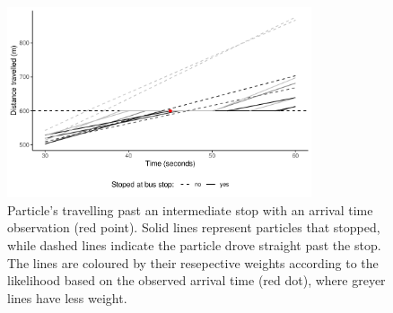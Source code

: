 \begin{knitrout}\small
{}\color{fgcolor}\begin{figure}

{\centering \includegraphics[width=0.8\textwidth]{figure/tu_update-1} 

}

\caption[Particle's travelling past an intermediate stop with an arrival time observation (red point)]{Particle's travelling past an intermediate stop with an arrival time observation (red point). Solid lines represent particles that stopped, while dashed lines indicate the particle drove straight past the stop. The lines are coloured by their resepective weights according to the likelihood based on the observed arrival time (red dot), where greyer lines have less weight.}\label{fig:tu_update}
\end{figure}


\end{knitrout}
